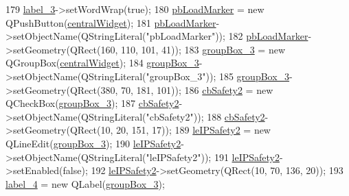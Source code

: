 \begin{DoxyCode}
179         \hyperlink{class_ui___rigid_track_class_a40dc760bee515c66ebe81f67b2d7f5f9}{label\_3}->setWordWrap(\textcolor{keyword}{true});
180         \hyperlink{class_ui___rigid_track_class_a76c00d83ae38b7eaa03ef28c280631fa}{pbLoadMarker} = \textcolor{keyword}{new} QPushButton(\hyperlink{class_ui___rigid_track_class_ad0855ddf1efd8f0c8821dd2142f6221d}{centralWidget});
181         \hyperlink{class_ui___rigid_track_class_a76c00d83ae38b7eaa03ef28c280631fa}{pbLoadMarker}->setObjectName(QStringLiteral(\textcolor{stringliteral}{"pbLoadMarker"}));
182         \hyperlink{class_ui___rigid_track_class_a76c00d83ae38b7eaa03ef28c280631fa}{pbLoadMarker}->setGeometry(QRect(160, 110, 101, 41));
183         \hyperlink{class_ui___rigid_track_class_a822d802011c4868603863fa70f5589ae}{groupBox\_3} = \textcolor{keyword}{new} QGroupBox(\hyperlink{class_ui___rigid_track_class_ad0855ddf1efd8f0c8821dd2142f6221d}{centralWidget});
184         \hyperlink{class_ui___rigid_track_class_a822d802011c4868603863fa70f5589ae}{groupBox\_3}->setObjectName(QStringLiteral(\textcolor{stringliteral}{"groupBox\_3"}));
185         \hyperlink{class_ui___rigid_track_class_a822d802011c4868603863fa70f5589ae}{groupBox\_3}->setGeometry(QRect(380, 70, 181, 101));
186         \hyperlink{class_ui___rigid_track_class_a1e5273e53cb1276c8c056f1da4e72910}{cbSafety2} = \textcolor{keyword}{new} QCheckBox(\hyperlink{class_ui___rigid_track_class_a822d802011c4868603863fa70f5589ae}{groupBox\_3});
187         \hyperlink{class_ui___rigid_track_class_a1e5273e53cb1276c8c056f1da4e72910}{cbSafety2}->setObjectName(QStringLiteral(\textcolor{stringliteral}{"cbSafety2"}));
188         \hyperlink{class_ui___rigid_track_class_a1e5273e53cb1276c8c056f1da4e72910}{cbSafety2}->setGeometry(QRect(10, 20, 151, 17));
189         \hyperlink{class_ui___rigid_track_class_a70522f29594cbdc654ffed858b3e1fc5}{leIPSafety2} = \textcolor{keyword}{new} QLineEdit(\hyperlink{class_ui___rigid_track_class_a822d802011c4868603863fa70f5589ae}{groupBox\_3});
190         \hyperlink{class_ui___rigid_track_class_a70522f29594cbdc654ffed858b3e1fc5}{leIPSafety2}->setObjectName(QStringLiteral(\textcolor{stringliteral}{"leIPSafety2"}));
191         \hyperlink{class_ui___rigid_track_class_a70522f29594cbdc654ffed858b3e1fc5}{leIPSafety2}->setEnabled(\textcolor{keyword}{false});
192         \hyperlink{class_ui___rigid_track_class_a70522f29594cbdc654ffed858b3e1fc5}{leIPSafety2}->setGeometry(QRect(10, 70, 136, 20));
193         \hyperlink{class_ui___rigid_track_class_aa8e51b4d3909b5d36d9d64961d2648a3}{label\_4} = \textcolor{keyword}{new} QLabel(\hyperlink{class_ui___rigid_track_class_a822d802011c4868603863fa70f5589ae}{groupBox\_3});

\end{DoxyCode}
